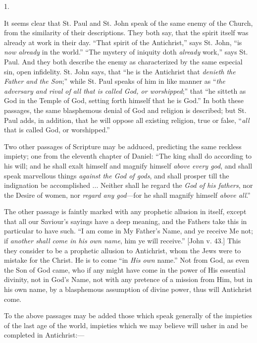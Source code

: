 1.

It seems clear that St. Paul and St. John speak of the same enemy
of the Church, from the similarity of their descriptions. They both
say, that the spirit itself was already at work in their day.
``That spirit of the Antichrist,'' says St. John, ``is \emph{now
already} in the world.'' ``The mystery of iniquity doth \emph{already}
work,'' says St. Paul. And they both describe the enemy as
characterized by the same especial sin, open infidelity. St. John
says, that ``he is the Antichrist that \emph{denieth the Father and
the Son};'' while St. Paul speaks of him in like manner as
``\emph{the adversary and rival of all that is called God, or
worshipped};'' that ``he sitteth as God in the Temple of
God, setting forth himself that he is God.'' In both these
passages, the same blasphemous denial of God and religion is
described; but St. Paul adds, in addition, that he will oppose all
existing religion, true or false, ``\emph{all} that is called God, or
worshipped.''

Two other passages of Scripture may be adduced, predicting the same
reckless impiety; one from the eleventh chapter of Daniel: ``The
king shall do according to his will; and he shall exalt himself and
magnify himself \emph{above every god}, and shall speak marvellous
things \emph{against the God of gods}, and shall prosper till the
indignation be accomplished ... Neither shall he regard the \emph{God of
his fathers}, nor the Desire of women, nor \emph{regard any god}—for
he shall magnify himself \emph{above all}.''

The other passage is faintly marked with any prophetic allusion in
itself, except that all our Saviour's sayings have a deep meaning, and
the Fathers take this in particular to have such. ``I am come in
My Father's Name, and ye receive Me not; if \emph{another shall come in
his own name}, him ye will receive.'' [John v. 43.] This they
consider to be a prophetic allusion to Antichrist, whom the Jews
were to mistake for the Christ. He is to come ``in \emph{His own}
name.'' Not from God, as even the Son of God came, who if any
might have come in the power of His essential divinity, not in God's
Name, not with any pretence of a mission from Him, but in his own
name, by a blasphemous assumption of divine power, thus will
Antichrist come.

To the above passages may be added those which speak generally of
the impieties of the last age of the world, impieties which we may
believe will usher in and be completed in Antichrist:—

